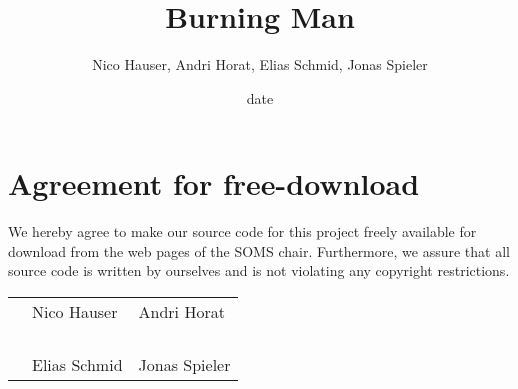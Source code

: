 \documentclass[11pt]{article}
\title{Burning Man}
\author{Nico Hauser, Andri Horat, Elias Schmid, Jonas Spieler}
\date{date}
\begin{document}

\newpage


\newpage
\section*{Agreement for free-download}
\bigskip


\bigskip


\large We hereby agree to make our source code for this project freely available for download from the web pages of the SOMS chair. Furthermore, we assure that all source code is written by ourselves and is not violating any copyright restrictions.

\begin{center}

\bigskip


\bigskip


\begin{tabular}{@{}p{3.3cm}@{}p{6cm}@{}@{}p{6cm}@{}}
\begin{minipage}{3cm}

\end{minipage}
&
\begin{minipage}{6cm}
\vspace{2mm} \large Nico Hauser
 \vspace{\baselineskip}

\end{minipage}
&
\begin{minipage}{6cm}

\large Andri Horat

\end{minipage}
\\
\\
\\
\\
\\
\begin{minipage}{3cm}

\end{minipage}
&
\begin{minipage}{6cm}
\vspace{2mm} \large Elias Schmid

 \vspace{\baselineskip}

\end{minipage}
&
\begin{minipage}{6cm}

\large Jonas Spieler

\end{minipage}
\end{tabular}


\end{center}
\newpage
\end{document}

